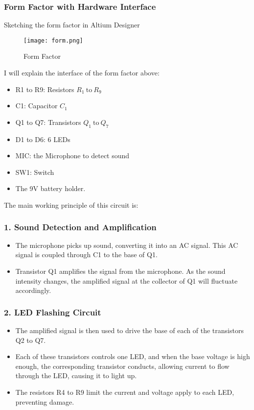 \documentclass[a4paper]{article}
\numberwithin{figure}{section}
\begin{document}
\subsubsection{Form Factor with Hardware Interface}
Sketching the form factor in Altium Designer
\begin{figure}[H]
    \centering
    \texttt{[image: form.png]}
    \caption{Form Factor}
\end{figure}
I will explain the interface of the form factor above:
\begin{itemize}
    \item R1 to R9: Resistors $R_1 \ \text{to} \ R_9$
    \item C1: Capacitor $C_1$
    \item Q1 to Q7: Transistors $Q_1 \ \text{to} \ Q_7$
    \item D1 to D6: 6 LEDs 
    \item MIC: the Microphone to detect sound
    \item SW1: Switch
    \item The 9V battery holder.
\end{itemize}

The main working principle of this circuit is:
\subsubsection*{1. Sound Detection and Amplification}
\begin{itemize}
    \item The microphone picks up sound, converting it into an AC signal. This AC signal is coupled through C1 to the base of Q1.
    \item Transistor Q1 amplifies the signal from the microphone. As the sound intensity changes, the amplified signal at the collector of Q1 will fluctuate accordingly.
\end{itemize}
\subsubsection*{2. LED Flashing Circuit}
\begin{itemize}
    \item The amplified signal is then used to drive the base of each of the transistors Q2 to Q7.
    \item Each of these transistors controls one LED, and when the base voltage is high enough, the corresponding transistor conducts, allowing current to flow through the LED, causing it to light up.
    \item The resistors R4 to R9 limit the current and voltage apply to each LED, preventing damage.
\end{itemize}
\end{document}
